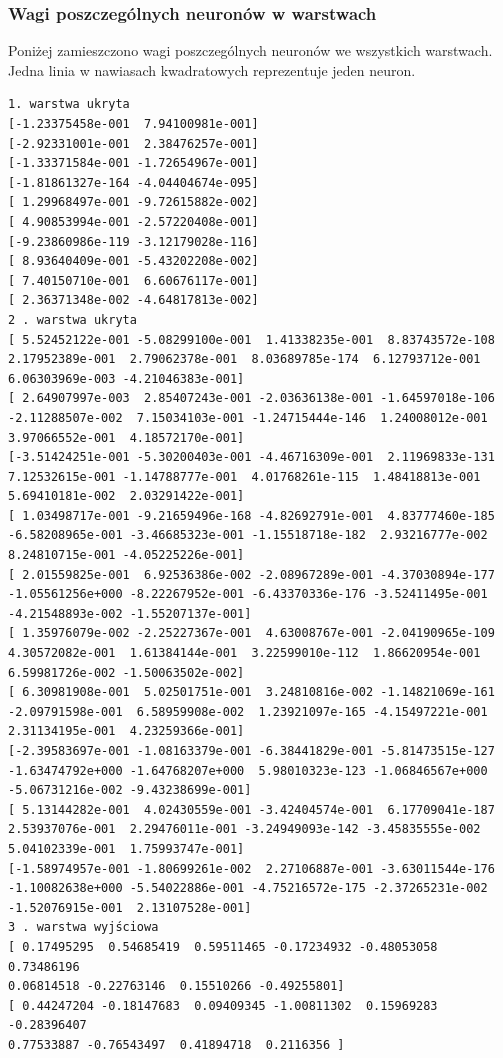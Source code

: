 \documentclass{classrep}
\begin{document}
\subsubsection{Wagi poszczególnych neuronów w warstwach} 
Poniżej zamieszczono wagi poszczególnych neuronów we wszystkich warstwach. Jedna linia w nawiasach kwadratowych reprezentuje jeden neuron.
\begin{verbatim}
1. warstwa ukryta
[-1.23375458e-001  7.94100981e-001]
[-2.92331001e-001  2.38476257e-001]
[-1.33371584e-001 -1.72654967e-001]
[-1.81861327e-164 -4.04404674e-095]
[ 1.29968497e-001 -9.72615882e-002]
[ 4.90853994e-001 -2.57220408e-001]
[-9.23860986e-119 -3.12179028e-116]
[ 8.93640409e-001 -5.43202208e-002]
[ 7.40150710e-001  6.60676117e-001]
[ 2.36371348e-002 -4.64817813e-002]
2 . warstwa ukryta
[ 5.52452122e-001 -5.08299100e-001  1.41338235e-001  8.83743572e-108
2.17952389e-001  2.79062378e-001  8.03689785e-174  6.12793712e-001
6.06303969e-003 -4.21046383e-001]
[ 2.64907997e-003  2.85407243e-001 -2.03636138e-001 -1.64597018e-106
-2.11288507e-002  7.15034103e-001 -1.24715444e-146  1.24008012e-001
3.97066552e-001  4.18572170e-001]
[-3.51424251e-001 -5.30200403e-001 -4.46716309e-001  2.11969833e-131
7.12532615e-001 -1.14788777e-001  4.01768261e-115  1.48418813e-001
5.69410181e-002  2.03291422e-001]
[ 1.03498717e-001 -9.21659496e-168 -4.82692791e-001  4.83777460e-185
-6.58208965e-001 -3.46685323e-001 -1.15518718e-182  2.93216777e-002
8.24810715e-001 -4.05225226e-001]
[ 2.01559825e-001  6.92536386e-002 -2.08967289e-001 -4.37030894e-177
-1.05561256e+000 -8.22267952e-001 -6.43370336e-176 -3.52411495e-001
-4.21548893e-002 -1.55207137e-001]
[ 1.35976079e-002 -2.25227367e-001  4.63008767e-001 -2.04190965e-109
4.30572082e-001  1.61384144e-001  3.22599010e-112  1.86620954e-001
6.59981726e-002 -1.50063502e-002]
[ 6.30981908e-001  5.02501751e-001  3.24810816e-002 -1.14821069e-161
-2.09791598e-001  6.58959908e-002  1.23921097e-165 -4.15497221e-001
2.31134195e-001  4.23259366e-001]
[-2.39583697e-001 -1.08163379e-001 -6.38441829e-001 -5.81473515e-127
-1.63474792e+000 -1.64768207e+000  5.98010323e-123 -1.06846567e+000
-5.06731216e-002 -9.43238699e-001]
[ 5.13144282e-001  4.02430559e-001 -3.42404574e-001  6.17709041e-187
2.53937076e-001  2.29476011e-001 -3.24949093e-142 -3.45835555e-002
5.04102339e-001  1.75993747e-001]
[-1.58974957e-001 -1.80699261e-002  2.27106887e-001 -3.63011544e-176
-1.10082638e+000 -5.54022886e-001 -4.75216572e-175 -2.37265231e-002
-1.52076915e-001  2.13107528e-001]
3 . warstwa wyjściowa
[ 0.17495295  0.54685419  0.59511465 -0.17234932 -0.48053058  0.73486196
0.06814518 -0.22763146  0.15510266 -0.49255801]
[ 0.44247204 -0.18147683  0.09409345 -1.00811302  0.15969283 -0.28396407
0.77533887 -0.76543497  0.41894718  0.2116356 ]

\end{verbatim}
\end{document}
